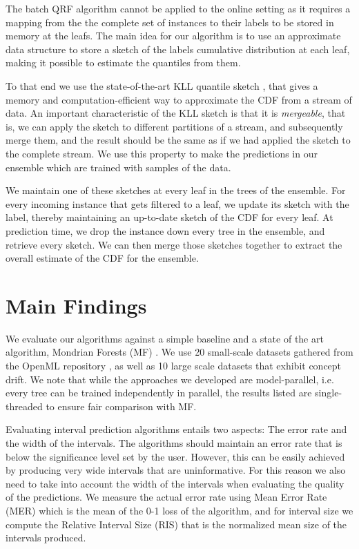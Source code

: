 The batch QRF algorithm cannot be applied to the online setting as it requires
a mapping from the the complete set of instances to their labels to be stored
in memory at the leafs. The main idea for our algorithm is to use an approximate data
structure to store a sketch of the labels cumulative distribution at each leaf,
making it possible to estimate the quantiles from them.

To that end we use the state-of-the-art KLL quantile sketch \cite{karnin2016kll},
that gives a memory and computation-efficient way to approximate the CDF from
a stream of data. An important characteristic of the KLL sketch is that it is
\emph{mergeable}, that is, we can apply the sketch to different partitions of
a stream, and subsequently merge them, and the result should be the same
as if we had applied the sketch to the complete stream. We use this property
to make the predictions in our ensemble which are trained with samples of the
data.

We maintain  one of these sketches at every leaf in the trees of the ensemble.
For every incoming instance that gets filtered to a leaf, we update its sketch
with the label, thereby maintaining an up-to-date sketch of the CDF for every
leaf. At prediction time, we drop the instance
down every tree in the ensemble, and retrieve every sketch.
We can then merge those sketches together to extract the overall estimate
of the CDF for the ensemble.

\section{Main Findings}
\label{sec:uncertain-trees-results}

We evaluate our algorithms against a simple baseline and a state of the art
algorithm, Mondrian Forests (MF) \cite{mondrian-forests-original}. We use 20 small-scale
datasets gathered from the OpenML repository \cite{vanschoren2013openml}, as well
as 10 large scale datasets that exhibit concept drift. We note that while the approaches we developed are model-parallel, i.e.
every tree can be trained independently in parallel, the results listed are single-threaded
to ensure fair comparison with MF.

Evaluating interval prediction algorithms entails two aspects: The error rate
and the width of the intervals. The algorithms should maintain an error rate
that is below the significance level set by the user. However, this can be
easily achieved by producing very wide intervals that are uninformative.
For this reason we also need to take into account the width of  the intervals when
evaluating the quality of the predictions. We measure the actual error rate using Mean Error Rate (MER)
which is the mean of the 0-1 loss of the algorithm, and for interval size we compute
the Relative Interval Size (RIS) that
is the normalized mean size of the intervals produced.

